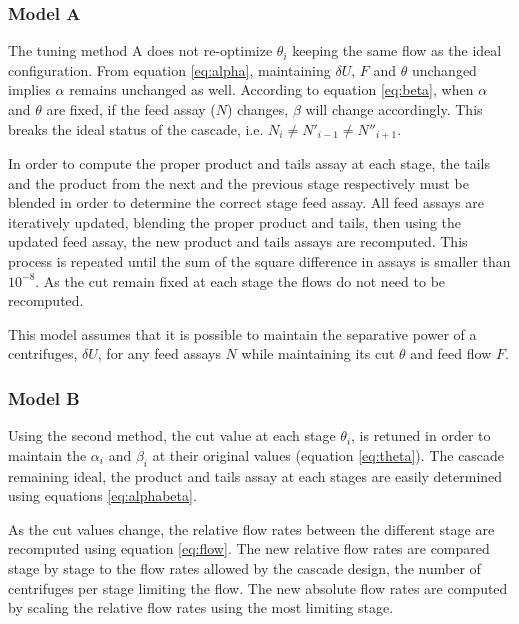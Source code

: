 \subsubsection{Model A}

The tuning method A does not re-optimize $\theta_i$ keeping the same flow as the
ideal configuration. From equation \eqref{eq:alpha}, maintaining $\delta U$, $F$
and $\theta$ unchanged implies $\alpha$ remains unchanged as well. According to
equation \eqref{eq:beta}, when $\alpha$ and $\theta$ are fixed, if the feed
assay ($N$) changes, $\beta$ will change accordingly.  This breaks the
ideal status of the cascade, i.e. $N_{i} \neq N'_{i-1} \neq N''_{i+1}$.


In order to compute the proper product and tails assay at each stage, the tails
and the product from the next and the previous stage respectively must be
blended in order to determine the correct stage feed assay. All feed assays are
iteratively updated, blending the proper product and tails, then using the
updated feed assay, the new product and tails assays are recomputed. This
process is repeated until the sum of the square difference in assays is smaller
than $10^{-8}$.  As the cut remain fixed at each stage the flows do not need to
be recomputed.

This model assumes that it is possible to maintain the separative power of a
centrifuges, $\delta U$, for any feed assays $N$ while maintaining its cut
$\theta$ and feed flow $F$.

\subsubsection{Model B}

Using the second method, the cut value at each stage $\theta_i$, is retuned in
order to maintain the $\alpha_i$ and $\beta_i$ at their original values
(equation \eqref{eq:theta}). The cascade remaining ideal, the product and tails
assay at each stages are easily determined using equations \eqref{eq:alphabeta}.

As the cut values change, the relative flow rates between the different stage
are recomputed using equation \eqref{eq:flow}. 
The new relative flow rates are compared stage by stage to the flow rates allowed by the
cascade design, the number of centrifuges per stage limiting the flow. The new
absolute flow rates are computed by scaling the relative flow rates using the most
limiting stage. 


